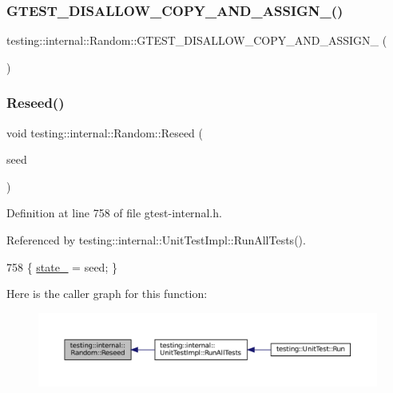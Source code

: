 \subsubsection{\texorpdfstring{G\+T\+E\+S\+T\+\_\+\+D\+I\+S\+A\+L\+L\+O\+W\+\_\+\+C\+O\+P\+Y\+\_\+\+A\+N\+D\+\_\+\+A\+S\+S\+I\+G\+N\+\_\+()}{GTEST\_DISALLOW\_COPY\_AND\_ASSIGN\_()}}
{\footnotesize\ttfamily testing\+::internal\+::\+Random\+::\+G\+T\+E\+S\+T\+\_\+\+D\+I\+S\+A\+L\+L\+O\+W\+\_\+\+C\+O\+P\+Y\+\_\+\+A\+N\+D\+\_\+\+A\+S\+S\+I\+G\+N\+\_\+ (\begin{DoxyParamCaption}\item[{\hyperlink{classtesting_1_1internal_1_1Random}{Random}}]{ }\end{DoxyParamCaption})\hspace{0.3cm}{\ttfamily [private]}}

\mbox{\label{classtesting_1_1internal_1_1Random_adf2f24199318a46f885c78f50d89a69e}} 
\subsubsection{\texorpdfstring{Reseed()}{Reseed()}}
{\footnotesize\ttfamily void testing\+::internal\+::\+Random\+::\+Reseed (\begin{DoxyParamCaption}\item[{\hyperlink{namespacetesting_1_1internal_a40d4fffcd2bf56f18b1c380615aa85e3}{U\+Int32}}]{seed }\end{DoxyParamCaption})\hspace{0.3cm}{\ttfamily [inline]}}



Definition at line 758 of file gtest-\/internal.\+h.



Referenced by testing\+::internal\+::\+Unit\+Test\+Impl\+::\+Run\+All\+Tests().


\begin{DoxyCode}
758 \{ \hyperlink{classtesting_1_1internal_1_1Random_ad500e33e3342415afb8a3ab242afa9cc}{state\_} = seed; \}
\end{DoxyCode}
Here is the caller graph for this function\+:
\nopagebreak
\begin{figure}[H]
\begin{center}
\leavevmode
\includegraphics[width=350pt]{classtesting_1_1internal_1_1Random_adf2f24199318a46f885c78f50d89a69e_icgraph}
\end{center}
\end{figure}


